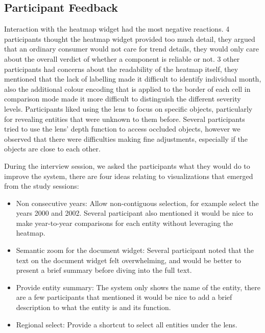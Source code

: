 
\subsection{Participant Feedback}
Interaction with the heatmap widget had the most negative reactions. 4
participants thought the heatmap widget provided too much detail, they argued
that an ordinary consumer would not care for trend details, they would only care
about the overall verdict of whether a component is reliable or not. 3 other
participants had concerns about the readability of the heatmap itself, they
mentioned that the lack of labelling made it difficult to identify individual
month, also the additional colour encoding that is applied to the border of each
cell in comparison mode made it more difficult to distinguish the different
severity levels. Participants liked using the lens to focus on specific
objects, particularly for revealing entities that were unknown to them
before. Several participants tried to use the lens' depth function to access
occluded objects, however we observed that there were difficulties making fine
adjustments, especially if the objects are close to each other. 
  
During the interview session, we asked the participants what they would do to
improve the system, there are four ideas relating to visualizations that emerged
from the study sessions:
\begin{itemize}[noitemsep]
  \item Non consecutive years: Allow non-contiguous selection, for
  example select the years 2000 and 2002. Several participant also mentioned it
  would be nice to make year-to-year comparisons for each entity without
  leveraging the heatmap.
  
  \item Semantic zoom for the document widget: Several participant noted that
  the text on the document widget felt overwhelming, and would be better to
  present a brief summary before diving into the full text.
  
  \item Provide entity summary: The system only shows the name of the entity,
  there are a few participants that mentioned it would be nice to add a brief
  description to what the entity is and its function.
  
  \item Regional select: Provide a shortcut to select all entities under the
  lens.
\end{itemize}
   
